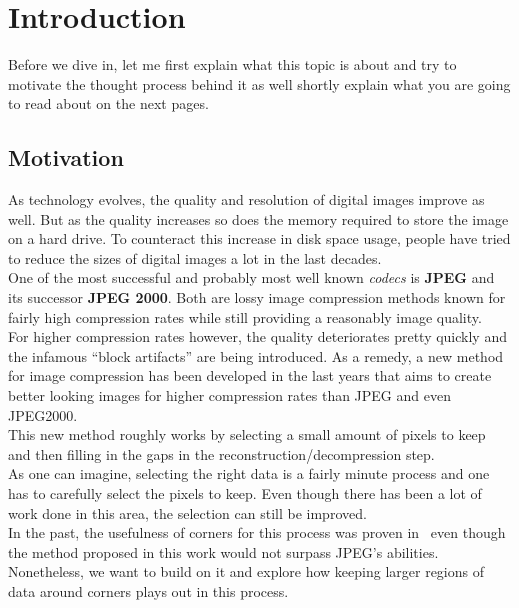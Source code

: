 \chapter{Introduction} %

\label{ch:Intro} %

Before we dive in, let me first explain what this topic is about and try to motivate the thought
process behind it as well shortly explain what you are going to read about on the next pages.

\section{Motivation}
\label{sec:Motivation}

As technology evolves, the quality and resolution of digital images improve as well. But as the
quality increases so does the memory required to store the image on a hard drive. To counteract
this increase in disk space usage, people have tried to reduce the sizes of digital images a lot in the
last decades.\\
One of the most successful and probably most well known \textit{codecs}
is \textbf{JPEG} and its successor \textbf{JPEG 2000}. Both are lossy image compression methods
known for fairly high compression rates while still providing a reasonably image quality.\\
For
higher compression rates however, the quality deteriorates pretty quickly and the infamous ``block
artifacts'' are being introduced. As a remedy, a new method for image compression has been developed in the last years that
aims to create better looking images for higher compression rates than JPEG and even JPEG2000. \\
This new method roughly works by selecting a small amount of pixels to keep and then filling in
the gaps in the reconstruction/decompression step.\\
As one can imagine, selecting the right data is a fairly minute process and one has to carefully
select the pixels to keep. Even though there has been a lot of work done in this area, the
selection can still be improved.\\
In the past, the usefulness of corners for this process was proven in~\cite{zimmer07} even though the
method proposed in this work would not surpass JPEG's abilities. Nonetheless, we want to build on
it and explore
how keeping larger regions of data around corners plays out in this process.

